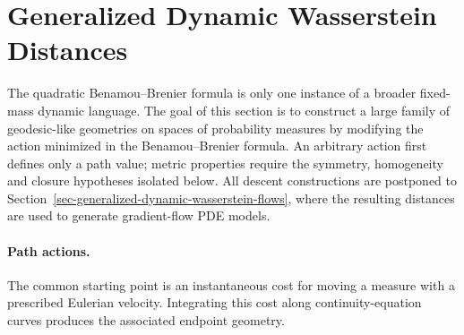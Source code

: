 
\section{Generalized Dynamic Wasserstein Distances}
\label{sec-bb-extensions}
\label{sec-generalized-dynamic-wasserstein-distances}

The quadratic Benamou--Brenier formula is only one instance of a broader fixed-mass dynamic language. The goal of this section is to construct a large family of geodesic-like geometries on spaces of probability measures by modifying the action minimized in the Benamou--Brenier formula. An arbitrary action first defines only a path value; metric properties require the symmetry, homogeneity and closure hypotheses isolated below. All descent constructions are postponed to Section~\ref{sec-generalized-dynamic-wasserstein-flows}, where the resulting distances are used to generate gradient-flow PDE models.

\paragraph{Path actions.}
The common starting point is an instantaneous cost for moving a measure with a prescribed Eulerian velocity. Integrating this cost along continuity-equation curves produces the associated endpoint geometry.

